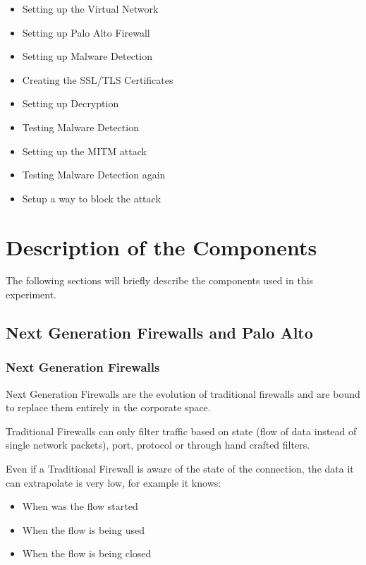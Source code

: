 \begin{itemize}
    \item Setting up the Virtual Network
    \item Setting up Palo Alto Firewall
    \item Setting up Malware Detection
    \item Creating the SSL/TLS Certificates
    \item Setting up Decryption
    \item Testing Malware Detection
    \item Setting up the MITM attack
    \item Testing Malware Detection again
    \item Setup a way to block the attack
\end{itemize}

\chapter{Description of the Components}

The following sections will briefly describe the components used in this experiment.

\section{Next Generation Firewalls and Palo Alto}

\subsection{Next Generation Firewalls}

Next Generation Firewalls are the evolution of traditional firewalls and are bound to replace them entirely in the corporate space.

Traditional Firewalls can only filter traffic based on state (flow of data instead of single network packets), port, protocol or through hand crafted filters.

Even if a Traditional Firewall is aware of the state of the connection, the data it can extrapolate is very low, for example it knows:

\begin{itemize}
 \item When was the flow started
 \item When the flow is being used
 \item When the flow is being closed
\end{itemize}

